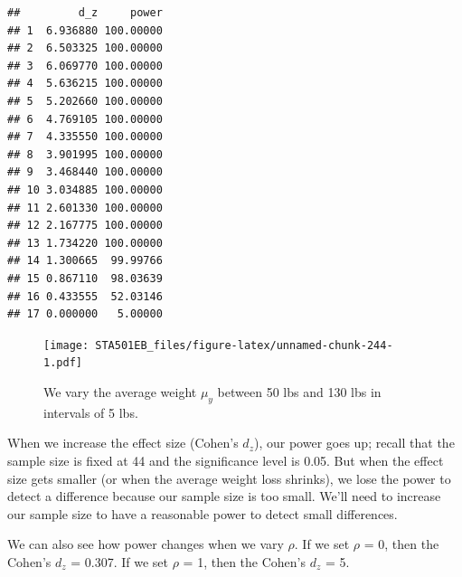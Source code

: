 \documentclass[
]{book}
\newenvironment{Shaded}{\begin{snugshade}}{\end{snugshade}}
\newcommand{\AttributeTok}[1]{\textcolor[rgb]{0.13,0.29,0.53}{#1}}
\newcommand{\DecValTok}[1]{\textcolor[rgb]{0.00,0.00,0.81}{#1}}
\newcommand{\FunctionTok}[1]{\textcolor[rgb]{0.13,0.29,0.53}{\textbf{#1}}}
\newcommand{\NormalTok}[1]{#1}
\newcommand{\SpecialCharTok}[1]{\textcolor[rgb]{0.81,0.36,0.00}{\textbf{#1}}}
\newcommand{\StringTok}[1]{\textcolor[rgb]{0.31,0.60,0.02}{#1}}
\begin{document}
\begin{verbatim}
##         d_z     power
## 1  6.936880 100.00000
## 2  6.503325 100.00000
## 3  6.069770 100.00000
## 4  5.636215 100.00000
## 5  5.202660 100.00000
## 6  4.769105 100.00000
## 7  4.335550 100.00000
## 8  3.901995 100.00000
## 9  3.468440 100.00000
## 10 3.034885 100.00000
## 11 2.601330 100.00000
## 12 2.167775 100.00000
## 13 1.734220 100.00000
## 14 1.300665  99.99766
## 15 0.867110  98.03639
## 16 0.433555  52.03146
## 17 0.000000   5.00000
\end{verbatim}

\begin{Shaded}
\end{Shaded}

\begin{figure}
\centering
\texttt{[image: STA501EB\_files/figure-latex/unnamed-chunk-244-1.pdf]}
\caption{\label{fig:unnamed-chunk-244}We vary the average weight \(\mu_{y}\) between 50 lbs and 130 lbs in intervals of 5 lbs.}
\end{figure}

When we increase the effect size (Cohen's \(d_{z}\)), our power goes up; recall that the sample size is fixed at 44 and the significance level is 0.05. But when the effect size gets smaller (or when the average weight loss shrinks), we lose the power to detect a difference because our sample size is too small. We'll need to increase our sample size to have a reasonable power to detect small differences.

We can also see how power changes when we vary \(\rho\). If we set \(\rho\) = 0, then the Cohen's \(d_{z}\) = 0.307. If we set \(\rho\) = 1, then the Cohen's \(d_{z}\) = 5.
\end{document}
